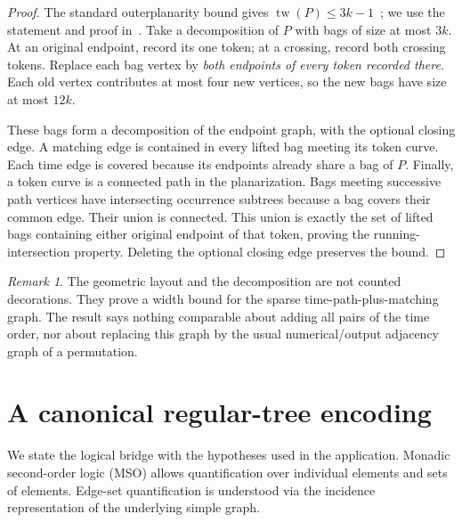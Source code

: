 \documentclass[11pt]{article}
\theoremstyle{definition}\newtheorem{definition}[theorem]{Definition}
\theoremstyle{remark}\newtheorem{remark}[theorem]{Remark}
\newcommand{\tw}{\operatorname{tw}}
\begin{document}
\begin{proof}
The standard outerplanarity bound gives $\tw(P)\le3k-1$~\cite{Bodlaender1998}; we use the statement and proof in~\cite[Theorem 3.8]{Katsikarelis2013}. Take a decomposition of $P$ with bags of size at most $3k$. At an original endpoint, record its one token; at a crossing, record both crossing tokens. Replace each bag vertex by \emph{both endpoints of every token recorded there}. Each old vertex contributes at most four new vertices, so the new bags have size at most $12k$.

These bags form a decomposition of the endpoint graph, with the optional closing edge. A matching edge is contained in every lifted bag meeting its token curve. Each time edge is covered because its endpoints already share a bag of $P$. Finally, a token curve is a connected path in the planarization. Bags meeting successive path vertices have intersecting occurrence subtrees because a bag covers their common edge. Their union is connected. This union is exactly the set of lifted bags containing either original endpoint of that token, proving the running-intersection property. Deleting the optional closing edge preserves the bound.
\end{proof}

\begin{remark}
The geometric layout and the decomposition are not counted decorations. They prove a width bound for the sparse time-path-plus-matching graph. The result says nothing comparable about adding all pairs of the time order, nor about replacing this graph by the usual numerical/output adjacency graph of a permutation.
\end{remark}

\section{A canonical regular-tree encoding}\label{sec:logic}
We state the logical bridge with the hypotheses used in the application. Monadic second-order logic (MSO) allows quantification over individual elements and sets of elements. Edge-set quantification is understood via the incidence representation of the underlying simple graph.
\end{document}
